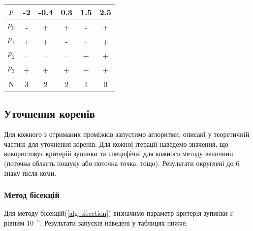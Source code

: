 \begin{table}[h!]
    \centering
    \begin{tabular}{|c|c|c|c|c|c|}
        \hline
        $p$ & -2 & -0.4 & 0.3 & 1.5 & 2.5 \\
        \hline
        $p_0$ & - & + & + & - & + \\
        \hline
        $p_1$ & + & + & - & + & + \\
        \hline
        $p_2$ & - & - & - & + & + \\
        \hline
        $p_3$ & + & + & + & + & + \\
        \hline
        N & 3 & 2 & 2 & 1 & 0 \\
        \hline
    \end{tabular}
\end{table}

\pagebreak
\subsection*{Уточнення коренів}

Для кожного з отриманих проміжків запустимо аглоритми,
описані у теоретичній частині для уточнення коренів. Для кожної ітерації
наведемо значення, що використовує критерій
зупинки та специфічні для кожного методу величини
(поточна область пошуку або поточна точка, тощо).
Результати округлені до 6 знаку після коми.

\subsubsection*{Метод бісекцій}
Для методу бісекцій(\ref{alg:bisection}) визначимо параметр критерія зупинки
$\varepsilon$ рівним $10^{-5}$.
Результати запусків наведені у таблицях нижче.

